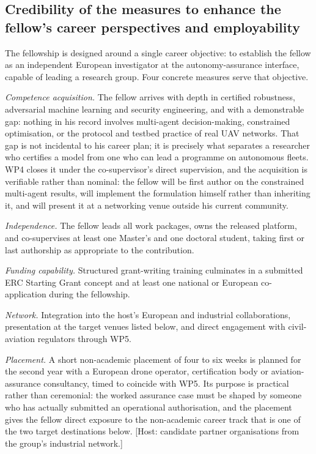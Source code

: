 \documentclass[11pt,a4paper]{article}
\begin{document}
\subsection{Credibility of the measures to enhance the fellow's career perspectives and employability}
The fellowship is designed around a single career objective: to establish the fellow as an independent European investigator at the autonomy-assurance interface, capable of leading a research group. Four concrete measures serve that objective.

\emph{Competence acquisition.} The fellow arrives with depth in certified
robustness, adversarial machine learning and security engineering, and with a
demonstrable gap: nothing in his record involves multi-agent decision-making,
constrained optimisation, or the protocol and testbed practice of real UAV
networks. That gap is not incidental to his career plan; it is precisely what
separates a researcher who certifies a model from one who can lead a programme
on autonomous fleets. WP4 closes it under the co-supervisor's direct
supervision, and the acquisition is verifiable rather than nominal: the fellow
will be first author on the constrained multi-agent results, will implement the
formulation himself rather than inheriting it, and will present it at a
networking venue outside his current community.

\emph{Independence.} The fellow leads all work packages, owns the released platform, and co-supervises at least one Master's and one doctoral student, taking first or last authorship as appropriate to the contribution.

\emph{Funding capability.} Structured grant-writing training culminates in a submitted ERC Starting Grant concept and at least one national or European co-application during the fellowship.

\emph{Network.} Integration into the host's European and industrial collaborations, presentation at the target venues listed below, and direct engagement with civil-aviation regulators through WP5.

\emph{Placement.} A short non-academic placement of four to six weeks is
planned for the second year with a European drone operator, certification body
or aviation-assurance consultancy, timed to coincide with WP5. Its purpose is
practical rather than ceremonial: the worked assurance case must be shaped by
someone who has actually submitted an operational authorisation, and the
placement gives the fellow direct exposure to the non-academic career track that
is one of the two target destinations below. [Host: candidate partner
organisations from the group's industrial network.]
\end{document}
